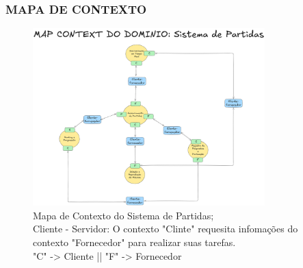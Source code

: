 \subsubsection{MAPA DE CONTEXTO}
    \begin{figure}[H]
        \centering
        \includegraphics[width=0.8\textwidth]{image/mapa_contexto_sistema_partida.png}
        \caption{Mapa de Contexto do Sistema de Partidas; \\ Cliente - Servidor:  O contexto "Clinte" requesita infomações do contexto "Fornecedor" para realizar suas tarefas. \\ "C" -> Cliente || "F" -> Fornecedor}
        \label{fig:minha_imagem}
    \end{figure}
